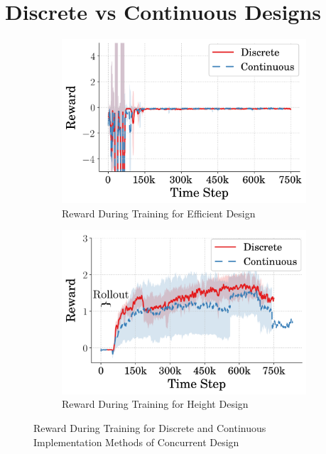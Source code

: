 \section{Discrete vs Continuous Designs}
\label{sec:disc_vs_cont}
%  
\begin{figure}[tb!]
  \centering
  \begin{subfigure}{.49\textwidth}
          \centering
          \includegraphics[width=\textwidth]{figures/Ch5/dis_vs_cont/avg_eff_rew_.png}  
          \caption{Reward During Training for Efficient Design}
          \label{fig:disc_vs_cont_rew_eff}
  \end{subfigure}%
  \hfill
  \begin{subfigure}{.49\textwidth}
          \centering
          \includegraphics[width=\textwidth]{figures/Ch5/dis_vs_cont/avg_hei_rew_.png}  
          \caption{Reward During Training for Height Design}
          \label{fig:disc_vs_cont_rew_high}
  \end{subfigure}
   \caption{Reward During Training for Discrete and Continuous Implementation Methods of Concurrent Design}
   \label{fig:disc_vs_cont_rew}
\end{figure}
% 

